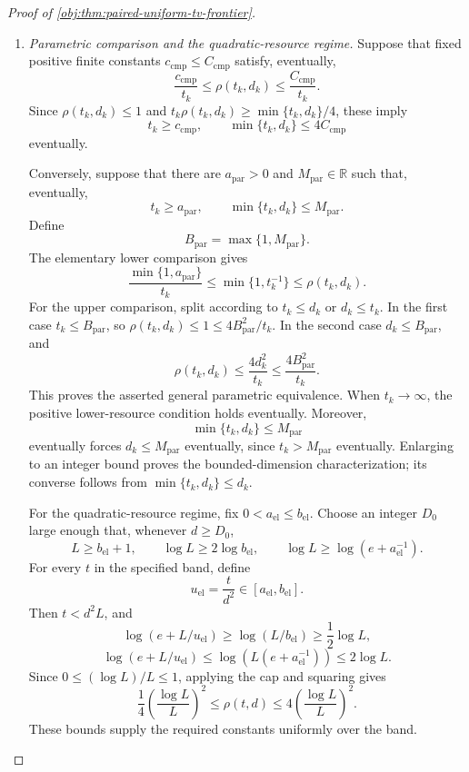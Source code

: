 \begin{proof}[Proof of \cref{obj:thm:paired-uniform-tv-frontier}]
\begin{enumerate}
\item \textit{Parametric comparison and the quadratic-resource regime.}
Suppose that fixed positive finite constants
\(c_{\mathrm{cmp}}\le C_{\mathrm{cmp}}\) satisfy, eventually,
\[
\frac{c_{\mathrm{cmp}}}{t_k}
\le\rho(t_k,d_k)
\le\frac{C_{\mathrm{cmp}}}{t_k}.
\]
Since \(\rho(t_k,d_k)\le1\) and
\(t_k\rho(t_k,d_k)\ge\min\{t_k,d_k\}/4\), these imply
\[
t_k\ge c_{\mathrm{cmp}},
\qquad
\min\{t_k,d_k\}\le4C_{\mathrm{cmp}}
\]
eventually.

Conversely, suppose that there are \(a_{\mathrm{par}}>0\) and
\(M_{\mathrm{par}}\in\mathbb R\) such that, eventually,
\[
t_k\ge a_{\mathrm{par}},
\qquad
\min\{t_k,d_k\}\le M_{\mathrm{par}}.
\]
Define
\[
B_{\mathrm{par}}=\max\{1,M_{\mathrm{par}}\}.
\]
The elementary lower comparison gives
\[
\frac{\min\{1,a_{\mathrm{par}}\}}{t_k}
\le\min\{1,t_k^{-1}\}\le\rho(t_k,d_k).
\]
For the upper comparison, split according to \(t_k\le d_k\) or \(d_k\le t_k\).
In the first case \(t_k\le B_{\mathrm{par}}\), so
\(\rho(t_k,d_k)\le1\le4B_{\mathrm{par}}^2/t_k\).
In the second case \(d_k\le B_{\mathrm{par}}\), and
\[
\rho(t_k,d_k)\le\frac{4d_k^2}{t_k}
\le\frac{4B_{\mathrm{par}}^2}{t_k}.
\]
This proves the asserted general parametric equivalence.
When \(t_k\to\infty\), the positive lower-resource condition holds eventually. Moreover,
\[
\min\{t_k,d_k\}\le M_{\mathrm{par}}
\]
eventually forces \(d_k\le M_{\mathrm{par}}\) eventually, since
\(t_k>M_{\mathrm{par}}\) eventually. Enlarging to an integer bound proves the bounded-dimension characterization; its converse follows from
\(\min\{t_k,d_k\}\le d_k\).

For the quadratic-resource regime, fix
\(0<a_{\mathrm{el}}\le b_{\mathrm{el}}\).
Choose an integer \(D_0\) large enough that, whenever \(d\ge D_0\),
\[
L\ge b_{\mathrm{el}}+1,\qquad
\log L\ge2\log b_{\mathrm{el}},\qquad
\log L\ge\log(e+a_{\mathrm{el}}^{-1}).
\]
For every \(t\) in the specified band, define
\[
u_{\mathrm{el}}=\frac{t}{d^2}\in[a_{\mathrm{el}},b_{\mathrm{el}}].
\]
Then \(t<d^2L\), and
\[
\log(e+L/u_{\mathrm{el}})
\ge\log(L/b_{\mathrm{el}})
\ge\frac12\log L,
\]
\[
\log(e+L/u_{\mathrm{el}})
\le\log\!\left(L(e+a_{\mathrm{el}}^{-1})\right)
\le2\log L.
\]
Since \(0\le(\log L)/L\le1\), applying the cap and squaring gives
\[
\frac14\left(\frac{\log L}{L}\right)^2
\le\rho(t,d)
\le4\left(\frac{\log L}{L}\right)^2.
\]
These bounds supply the required constants uniformly over the band.


\end{enumerate}
\end{proof}
